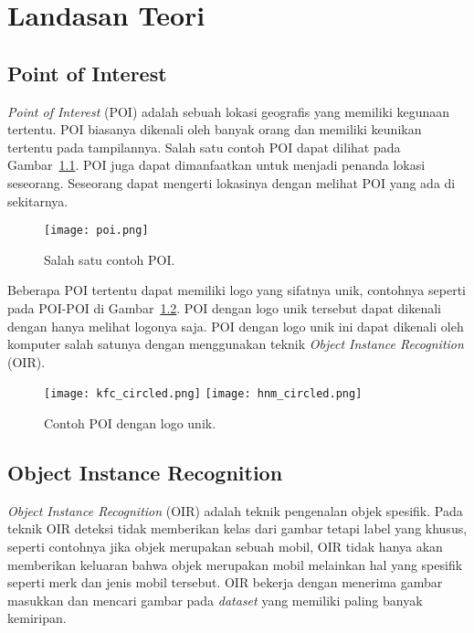 \chapter{Landasan Teori}
\label{chap:landasan_teori}

\section{Point of Interest}
\label{sec:poi}

\textit{Point of Interest} (POI) adalah sebuah lokasi geografis yang memiliki kegunaan tertentu. POI biasanya dikenali oleh banyak orang dan memiliki keunikan tertentu pada tampilannya. Salah satu contoh POI dapat dilihat pada Gambar~\ref{fig:poi}. POI juga dapat dimanfaatkan untuk menjadi penanda lokasi seseorang. Seseorang dapat mengerti lokasinya dengan melihat POI yang ada di sekitarnya.
\begin{figure}[H]
	\centering
	\texttt{[image: poi.png]}
	\caption{Salah satu contoh POI.}
	\label{fig:poi}
\end{figure}

Beberapa POI tertentu dapat memiliki logo yang sifatnya unik, contohnya seperti pada POI-POI di Gambar~\ref{fig:poi_logo}. POI dengan logo unik tersebut dapat dikenali dengan hanya melihat logonya saja. POI dengan logo unik ini dapat dikenali oleh komputer salah satunya dengan menggunakan teknik \textit{Object Instance Recognition} (OIR). 
\begin{figure}[H]
	\centering
	\texttt{[image: kfc\_circled.png]}
	\texttt{[image: hnm\_circled.png]}
	\caption{Contoh POI dengan logo unik.}
	\label{fig:poi_logo}
\end{figure}

\section{Object Instance Recognition}
\label{sec:oir}

\textit{Object Instance Recognition} (OIR) adalah teknik pengenalan objek spesifik. Pada teknik OIR deteksi tidak memberikan kelas dari gambar tetapi label yang khusus, seperti contohnya jika objek merupakan sebuah mobil, OIR tidak hanya akan memberikan keluaran bahwa objek merupakan mobil melainkan hal yang spesifik seperti merk dan jenis mobil tersebut. OIR bekerja dengan menerima gambar masukkan dan mencari gambar pada \textit{dataset} yang memiliki paling banyak kemiripan.

